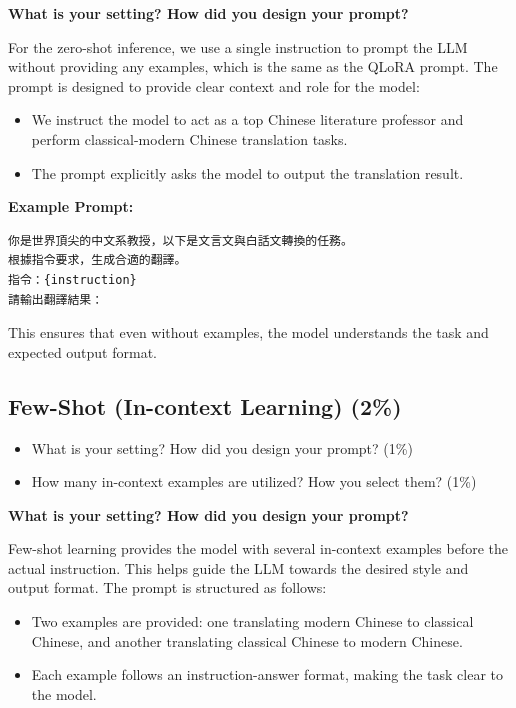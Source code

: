 \documentclass{article}
\begin{document}
\textbf{What is your setting? How did you design your prompt?}

For the zero-shot inference, we use a single instruction to prompt the LLM without providing any examples, which is the same as the QLoRA prompt. The prompt is designed to provide clear context and role for the model:

\begin{itemize}
    \item We instruct the model to act as a top Chinese literature professor and perform classical-modern Chinese translation tasks.
    \item The prompt explicitly asks the model to output the translation result.
\end{itemize}

\textbf{Example Prompt:}

\begin{verbatim}
你是世界頂尖的中文系教授，以下是文言文與白話文轉換的任務。
根據指令要求，生成合適的翻譯。
指令：{instruction}
請輸出翻譯結果：
\end{verbatim}

This ensures that even without examples, the model understands the task and expected output format.

\subsection{Few-Shot (In-context Learning) (2\%)}
\begin{itemize}
    \item What is your setting? How did you design your prompt? (1\%)
    \item How many in-context examples are utilized? How you select them? (1\%)
\end{itemize}

\textbf{What is your setting? How did you design your prompt?}

Few-shot learning provides the model with several in-context examples before the actual instruction. This helps guide the LLM towards the desired style and output format. The prompt is structured as follows:

\begin{itemize}
    \item Two examples are provided: one translating modern Chinese to classical Chinese, and another translating classical Chinese to modern Chinese.
    \item Each example follows an instruction-answer format, making the task clear to the model.
\end{itemize}
\end{document}
